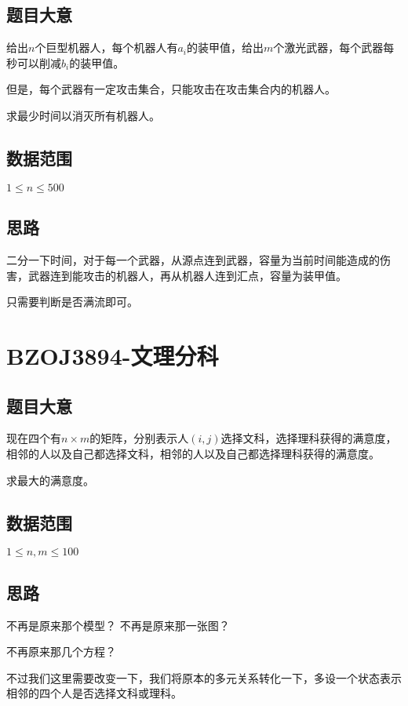 \documentclass{ctexart}
\numberwithin{equation}{section}
\begin{document}
\begin{flushleft}
  \subsection{题目大意}
  给出$n$个巨型机器人，每个机器人有$a_i$的装甲值，给出$m$个激光武器，每个武器每秒可以削减$b_i$的装甲值。

  但是，每个武器有一定攻击集合，只能攻击在攻击集合内的机器人。

  求最少时间以消灭所有机器人。
  
  \subsection{数据范围}
  $1\le n \le 500$
  \subsection{思路}
  二分一下时间，对于每一个武器，从源点连到武器，容量为当前时间能造成的伤害，武器连到能攻击的机器人，再从机器人连到汇点，容量为装甲值。

  只需要判断是否满流即可。
  \newpage

  \section{BZOJ3894-文理分科}
  \subsection{题目大意}
  现在四个有$n\times m$的矩阵，分别表示人$(i,j)$选择文科，选择理科获得的满意度，相邻的人以及自己都选择文科，相邻的人以及自己都选择理科获得的满意度。

  求最大的满意度。
  
  \subsection{数据范围}
  $1\le n,m \le 100$
  \newpage
  \subsection{思路}
  不再是原来那个模型？ 不再是原来那一张图？
  \begin{figure}[htb]
  \end{figure}

  不再原来那几个方程？

  不过我们这里需要改变一下，我们将原本的多元关系转化一下，多设一个状态表示相邻的四个人是否选择文科或理科。


\end{flushleft}
\end{document}

